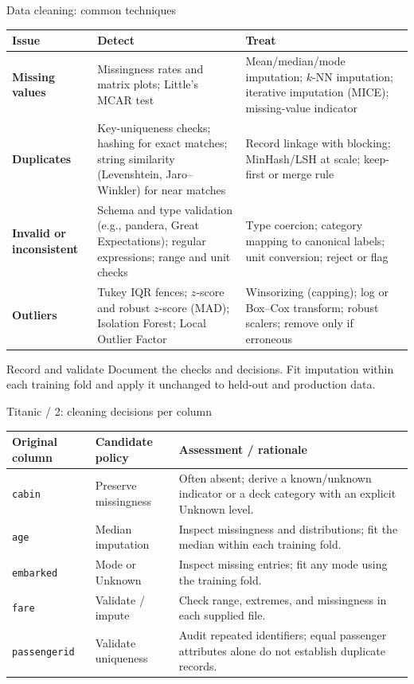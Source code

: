 \begin{frame}{Data cleaning: common techniques}
\begingroup\scriptsize
\renewcommand{\arraystretch}{1.1}
\begin{tabularx}{\textwidth}{>{\bfseries}p{2.9cm} >{\raggedright\arraybackslash}X >{\raggedright\arraybackslash}X}
\toprule
Issue & Detect & Treat \\
\midrule
Missing values & Missingness rates and matrix plots; Little's MCAR test & Mean/median/mode imputation; $k$-NN imputation; iterative imputation (MICE); missing-value indicator \\
\addlinespace[0.15em]
Duplicates & Key-uniqueness checks; hashing for exact matches; string similarity (Levenshtein, Jaro--Winkler) for near matches & Record linkage with blocking; MinHash/LSH at scale; keep-first or merge rule \\
\addlinespace[0.15em]
Invalid or inconsistent & Schema and type validation (e.g., pandera, Great Expectations); regular expressions; range and unit checks & Type coercion; category mapping to canonical labels; unit conversion; reject or flag \\
\addlinespace[0.15em]
Outliers & Tukey IQR fences; $z$-score and robust $z$-score (MAD); Isolation Forest; Local Outlier Factor & Winsorizing (capping); log or Box--Cox transform; robust scalers; remove only if erroneous \\
\bottomrule
\end{tabularx}
\par\endgroup
\vspace{0.1em}
\begin{block}{Record and validate}
Document the checks and decisions. Fit imputation within each training fold and apply it unchanged to held-out and production data.
\end{block}
\coursefooter
\end{frame}
\begin{frame}{Titanic / 2: cleaning decisions per column}
\small
\begin{tabularx}{\textwidth}{l l X}
\toprule
Original column & Candidate policy & Assessment / rationale \\
\midrule
\texttt{cabin} & Preserve missingness & Often absent; derive a known/unknown indicator or a deck category with an explicit Unknown level. \\
\texttt{age} & Median imputation & Inspect missingness and distributions; fit the median within each training fold. \\
\texttt{embarked} & Mode or Unknown & Inspect missing entries; fit any mode using the training fold. \\
\texttt{fare} & Validate / impute & Check range, extremes, and missingness in each supplied file. \\
\texttt{passengerid} & Validate uniqueness & Audit repeated identifiers; equal passenger attributes alone do not establish duplicate records. \\
\bottomrule
\end{tabularx}
\coursefooter
\end{frame}
